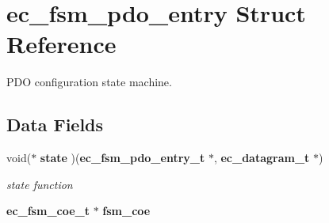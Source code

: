 \section{ec\-\_\-fsm\-\_\-pdo\-\_\-entry \-Struct \-Reference}
\label{structec__fsm__pdo__entry}


\-P\-D\-O configuration state machine.  


\subsection*{\-Data \-Fields}
\begin{DoxyCompactItemize}
\item 
void($\ast$ {\bf state} )({\bf ec\-\_\-fsm\-\_\-pdo\-\_\-entry\-\_\-t} $\ast$, {\bf ec\-\_\-datagram\-\_\-t} $\ast$)\label{structec__fsm__pdo__entry_ac55bdbce3537777fc9e3eb5d5e6a244d}

\begin{DoxyCompactList}\small\item\em state function \end{DoxyCompactList}\item 
{\bf ec\-\_\-fsm\-\_\-coe\-\_\-t} $\ast$ {\bf fsm\-\_\-coe}\label{structec__fsm__pdo__entry_a61449a8e0440b2e79a917d3e8fd96105}


\end{DoxyCompactItemize}
